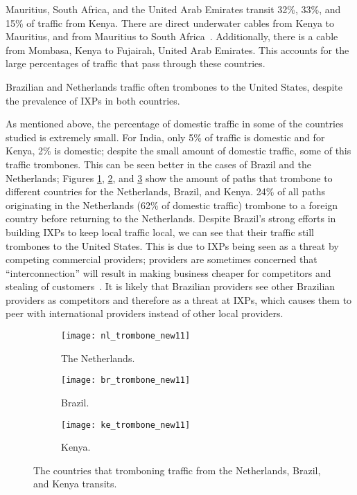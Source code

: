Mauritius, South Africa, and the United Arab Emirates transit 32\%, 33\%, and 15\% of traffic from Kenya.  There are direct underwater cables from Kenya to Mauritius, and from Mauritius to South Africa~\cite{cablemap}.  Additionally, there is a cable from Mombasa, Kenya to Fujairah, United Arab Emirates.  This accounts for the large percentages of traffic that pass through these countries.

\begin{finding}
Brazilian and Netherlands traffic often trombones to the United States, despite the prevalence of IXPs in both countries.
\end{finding}
As mentioned above, the percentage of domestic traffic in some of the countries studied is extremely small.  For India, only 5\% of traffic is domestic and for Kenya, 2\% is domestic; despite the small amount of domestic traffic, some of this traffic trombones.  This can be seen better in the cases of Brazil and the Netherlands; 
Figures \ref{fig:trombone_netherlands}, \ref{fig:trombone_brazil}, and \ref{fig:trombone_kenya} show the amount of paths that trombone to different countries for the Netherlands, Brazil, and Kenya. 24\% of all paths originating in the Netherlands (62\% of domestic traffic) trombone to a foreign country before returning to the Netherlands. Despite Brazil's strong efforts in building IXPs to keep local traffic local, we can see that their traffic still trombones to the United States.  This is due to IXPs being seen as a threat by competing commercial providers; providers are sometimes concerned that ``interconnection'' will result in making business cheaper for competitors and stealing of customers~\cite{ixp_policy}.  It is likely that Brazilian providers see other Brazilian providers as competitors and therefore as a threat at IXPs, which causes them to peer with international providers instead of other local providers.

\begin{figure*}[t!]
\begin{minipage}{\linewidth}
\begin{subfigure}[b]{.32\linewidth}
\texttt{[image: nl\_trombone\_new11]}
\caption{The Netherlands.\label{fig:trombone_netherlands}}
\end{subfigure}\qquad
\begin{subfigure}[b]{.32\linewidth}
\texttt{[image: br\_trombone\_new11]}
\caption{Brazil.\label{fig:trombone_brazil}}
\end{subfigure}\qquad
\begin{subfigure}[b]{.32\linewidth}
\texttt{[image: ke\_trombone\_new11]}
\caption{Kenya.\label{fig:trombone_kenya}}
\end{subfigure}
\end{minipage}
\caption{The countries that tromboning traffic from the Netherlands, Brazil, and Kenya transits.}
\label{fig:trombone}
\end{figure*}

